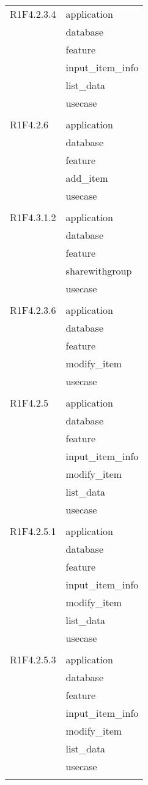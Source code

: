 \begin{center}
\begin{longtable}{|p{7cm}|p{5cm}|}
		R1F4.2.3.4 & application \\ & database \\ & feature \\ & input\_item\_info \\ & list\_data \\ & usecase \\ & \\ \hline
		R1F4.2.6 & application \\ & database \\ & feature \\ & add\_item \\ & usecase \\ & \\ \hline
		R1F4.3.1.2 & application \\ & database \\ & feature \\ & sharewithgroup \\ & usecase \\ & \\ \hline
		R1F4.2.3.6 & application \\ & database \\ & feature \\ & modify\_item \\ & usecase \\ & \\ \hline
		R1F4.2.5 & application \\ & database \\ & feature \\ & input\_item\_info \\ & modify\_item \\ & list\_data \\ & usecase \\ & \\ \hline
		R1F4.2.5.1 & application \\ & database \\ & feature \\ & input\_item\_info \\ & modify\_item \\ & list\_data \\ & usecase \\ & \\ \hline
		R1F4.2.5.3 & application \\ & database \\ & feature \\ & input\_item\_info \\ & modify\_item \\ & list\_data \\ & usecase \\ & \\ \hline

\end{longtable}
\end{center}
